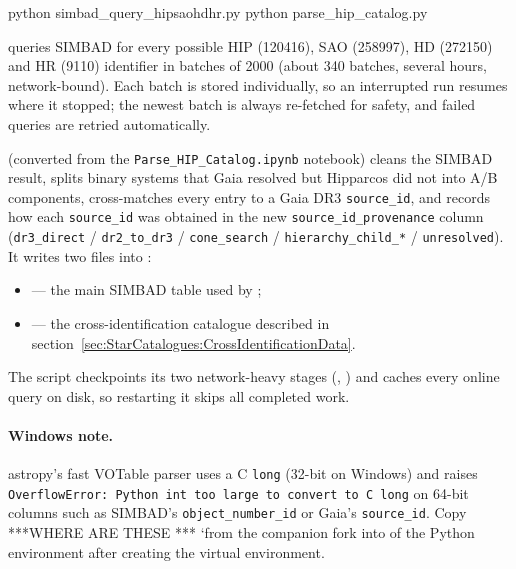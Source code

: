 \begin{commands}
python simbad_query_hipsaohdhr.py
python parse_hip_catalog.py
\end{commands}

 queries SIMBAD for every possible
HIP (120416), SAO (258997), HD (272150) and HR (9110) identifier in batches
of 2000 (about 340 batches, several hours, network-bound). Each batch is
stored individually, so an interrupted run resumes where it stopped; the
newest batch is always re-fetched for safety, and failed queries are
retried automatically.

 (converted from the
\texttt{Parse\_HIP\_Catalog.ipynb} notebook) cleans the SIMBAD result,
splits binary systems that Gaia resolved but Hipparcos did not into
A/B components, cross-matches every entry to a Gaia DR3
\texttt{source\_id}, and records how each \texttt{source\_id} was
obtained in the new \texttt{source\_id\_provenance} column
(\texttt{dr3\_direct} / \texttt{dr2\_to\_dr3} / \texttt{cone\_search}
/ \texttt{hierarchy\_child\_*} / \texttt{unresolved}). It writes two
files into :

\begin{itemize}
  \item {} --- the main SIMBAD table
        used by ;
  \item {} --- the cross-identification catalogue described
        in section~\ref{sec:StarCatalogues:CrossIdentificationData}.
\end{itemize}

The script checkpoints its two network-heavy stages
(, ) and caches every
online query on disk, so restarting it skips all completed work.

\paragraph{Windows note.} astropy's fast VOTable parser uses a C
\texttt{long} (32-bit on Windows) and raises
\texttt{OverflowError: Python int too large to convert to C long} on
64-bit columns such as SIMBAD's \texttt{object\_number\_id} or Gaia's
\texttt{source\_id}. Copy  ***WHERE ARE THESE *** `from the
companion fork into 
 of the Python environment after
creating the virtual environment.

